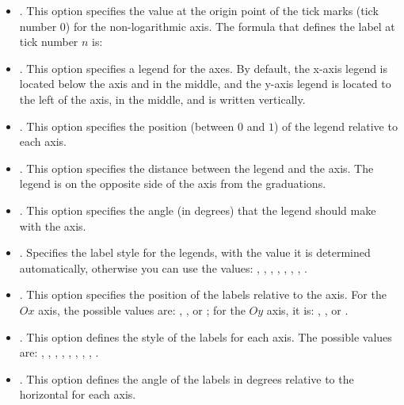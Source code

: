 \begin{itemize}
\begin{itemize}
    \item {}. This option specifies the value at the origin point of the tick marks (tick number $0$) for the non-logarithmic axis. The formula that defines the label at tick number $n$ is:
    
    \item {}. This option specifies a legend for the axes. By default, the x-axis legend is located below the axis and in the middle, and the y-axis legend is located to the left of the axis, in the middle, and is written vertically.
    
    \item {}. This option specifies the position (between $0$ and $1$) of the legend relative to each axis.
    
    \item {}. This option specifies the distance between the legend and the axis. The legend is on the opposite side of the axis from the graduations.
    
    \item {}. This option specifies the angle (in degrees) that the legend should make with the axis.
    
    \item {}. Specifies the label style for the legends, with the value  it is determined automatically, otherwise you can use the values: , , , , , , , .
    
    \item {}. This option specifies the position of the labels relative to the axis. For the $Ox$ axis, the possible values ​​are: , , or ; for the $Oy$ axis, it is: , , or .
    
    \item {}. This option defines the style of the labels for each axis. The possible values ​​are: , , , , , , , , .
    
    \item {}. This option defines the angle of the labels in degrees relative to the horizontal for each axis.
    

\end{itemize}
\end{itemize}
